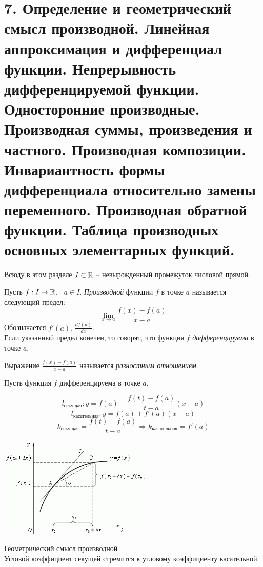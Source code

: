 \section{7. Определение и геометрический смысл производной. Линейная аппроксимация и дифференциал функции. Непрерывность дифференцируемой функции. Односторонние производные. Производная суммы, произведения и частного. Производная композиции. Инвариантность формы дифференциала относительно замены переменного. Производная обратной функции. Таблица производных основных элементарных функций.}

    Всюду в этом разделе $I \subset \mathbb{R}$ -- невырожденный промежуток числовой прямой.
    
    \begin{definition}
        Пусть $f: I \to \mathbb{R}$, \ $a \in I$. \textit{Производной} функции $f$ в точке $a$ называется следующий предел:
        \[\lim_{x \rightarrow a} \frac{f(x) - f(a)}{x - a}\]
        Обозначается $f'(a)$, $\frac{df(a)}{dx}$.\\
        Если указанный предел конечен, то говорят, что функция $f$ \textit{дифференцируема} в точке $a$.
    \end{definition}
    
    Выражение $\frac{f(x) - f(a)}{x - a}$ называется \textit{разностным отношением}.
    
    Пусть функция $f$ дифференцируема в точке $a$. 
    
    \[l_{\text{секущая}}: y = f(a) + \frac{f(t) - f(a)}{t - a} (x - a)\]
    \[l_{\text{касательная}}: y = f(a) + f'(a)(x - a)\]
    \[k_{\text{секущая}} = \frac{f(t) - f(a)}{t - a} \Rightarrow k_{\text{касательная}} = f'(a) \]
    
    \begin{center}
        \includegraphics[width=0.55\textwidth]{print_1.png}
    \end{center}
    
    \begin{note}{Геометрический смысл производной}\\
        Угловой коэффициент секущей стремится к угловому коэффициенту касательной.
    \end{note}
    
